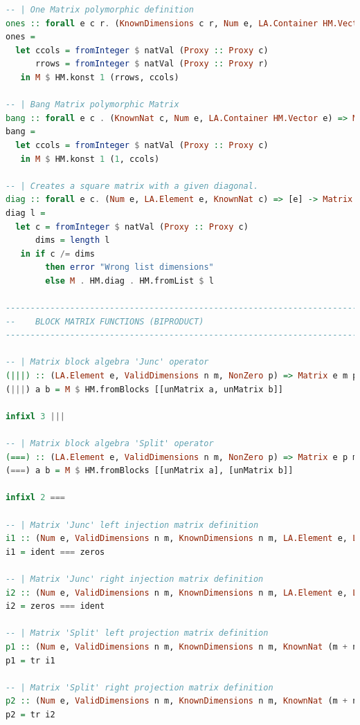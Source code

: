 \documentclass[
  oneside,
  11pt, a4paper,
  footinclude=true,
  headinclude=true,
  cleardoublepage=empty
]{scrbook}
\theoremstyle{definition}
\theoremstyle{definition}
\begin{document}
\begin{lstlisting}[language=Haskell, caption={Type safe matrix wrapper library},captionpos=b]
-- | One Matrix polymorphic definition
ones :: forall e c r. (KnownDimensions c r, Num e, LA.Container HM.Vector e) => Matrix e c r
ones =
  let ccols = fromInteger $ natVal (Proxy :: Proxy c)
      rrows = fromInteger $ natVal (Proxy :: Proxy r)
   in M $ HM.konst 1 (rrows, ccols)

-- | Bang Matrix polymorphic Matrix
bang :: forall e c . (KnownNat c, Num e, LA.Container HM.Vector e) => Matrix e c 1
bang =
  let ccols = fromInteger $ natVal (Proxy :: Proxy c)
   in M $ HM.konst 1 (1, ccols)

-- | Creates a square matrix with a given diagonal.
diag :: forall e c. (Num e, LA.Element e, KnownNat c) => [e] -> Matrix e c c
diag l =
  let c = fromInteger $ natVal (Proxy :: Proxy c)
      dims = length l
   in if c /= dims
        then error "Wrong list dimensions"
        else M . HM.diag . HM.fromList $ l

-------------------------------------------------------------------------------
--    BLOCK MATRIX FUNCTIONS (BIPRODUCT)
-------------------------------------------------------------------------------

-- | Matrix block algebra 'Junc' operator
(|||) :: (LA.Element e, ValidDimensions n m, NonZero p) => Matrix e m p -> Matrix e n p -> Matrix e (m + n) p
(|||) a b = M $ HM.fromBlocks [[unMatrix a, unMatrix b]]

infixl 3 |||

-- | Matrix block algebra 'Split' operator
(===) :: (LA.Element e, ValidDimensions n m, NonZero p) => Matrix e p m -> Matrix e p n -> Matrix e p (m + n)
(===) a b = M $ HM.fromBlocks [[unMatrix a], [unMatrix b]]

infixl 2 ===

-- | Matrix 'Junc' left injection matrix definition
i1 :: (Num e, ValidDimensions n m, KnownDimensions n m, LA.Element e, LA.Container HM.Vector e) => Matrix e m (m + n)
i1 = ident === zeros

-- | Matrix 'Junc' right injection matrix definition
i2 :: (Num e, ValidDimensions n m, KnownDimensions n m, LA.Element e, LA.Container HM.Vector e) => Matrix e n (m + n)
i2 = zeros === ident

-- | Matrix 'Split' left projection matrix definition
p1 :: (Num e, ValidDimensions n m, KnownDimensions n m, KnownNat (m + n), LA.Element e, LA.Container HM.Vector e) => Matrix e (m + n) m
p1 = tr i1

-- | Matrix 'Split' right projection matrix definition
p2 :: (Num e, ValidDimensions n m, KnownDimensions n m, KnownNat (m + n), LA.Element e, LA.Container HM.Vector e) => Matrix e (m + n) n
p2 = tr i2


\end{lstlisting}
\end{document}
